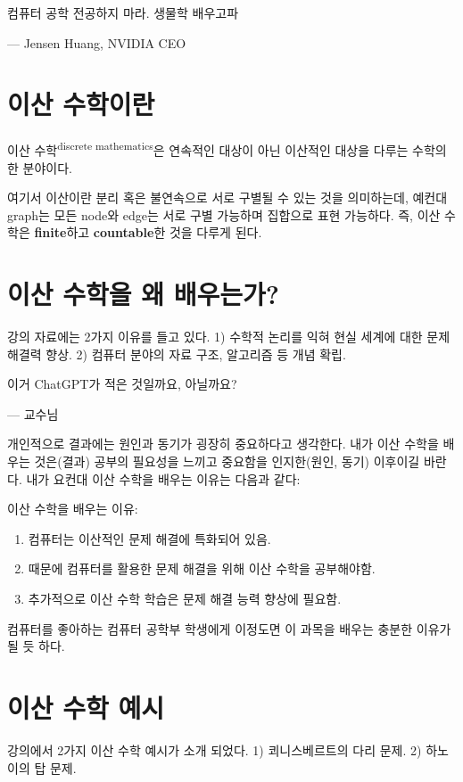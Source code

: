 \documentclass[../note.tex]{subfiles}
\begin{document}
\epigraph{컴퓨터 공학 전공하지 마라. 생물학 배우고파}{--- Jensen Huang, NVIDIA CEO}

\section{이산 수학이란}
\begin{definition}[이산 수학]
  이산 수학\textsuperscript{discrete mathematics}은 연속적인 대상이 아닌 이산적인 대상을 다루는 수학의 한 분야이다.
\end{definition}
여기서 이산이란 분리 혹은 불연속으로 서로 구별될 수 있는 것을 의미하는데, 예컨대 graph는 모든 node와 edge는 서로 구별 가능하며 집합으로 표현 가능하다. 즉, 이산 수학은 \textbf{finite}하고 \textbf{countable}한 것을 다루게 된다.

\section{이산 수학을 왜 배우는가?}
강의 자료에는 2가지 이유를 들고 있다. 1) 수학적 논리를 익혀 현실 세계에 대한 문제 해결력 향상. 2) 컴퓨터 분야의 자료 구조, 알고리즘 등 개념 확립.

\epigraph{이거 ChatGPT가 적은 것일까요, 아닐까요?}{--- 교수님}

개인적으로 결과에는 원인과 동기가 굉장히 중요하다고 생각한다. 내가 이산 수학을 배우는 것은(결과) 공부의 필요성을 느끼고 중요함을 인지한(원인, 동기) 이후이길 바란다. 내가 요컨대 이산 수학을 배우는 이유는 다음과 같다:
\begin{note}
  이산 수학을 배우는 이유:
  \begin{enumerate}
    \item
      컴퓨터는 이산적인 문제 해결에 특화되어 있음.
    \item
      때문에 컴퓨터를 활용한 문제 해결을 위해 이산 수학을 공부해야함.
    \item
      추가적으로 이산 수학 학습은 문제 해결 능력 향상에 필요함.
  \end{enumerate}
\end{note}
컴퓨터를 좋아하는 컴퓨터 공학부 학생에게 이정도면 이 과목을 배우는 충분한 이유가 될 듯 하다.

\section{이산 수학 예시}
강의에서 2가지 이산 수학 예시가 소개 되었다. 1) 쾨니스베르트의 다리 문제. 2) 하노이의 탑 문제.
\end{document}
